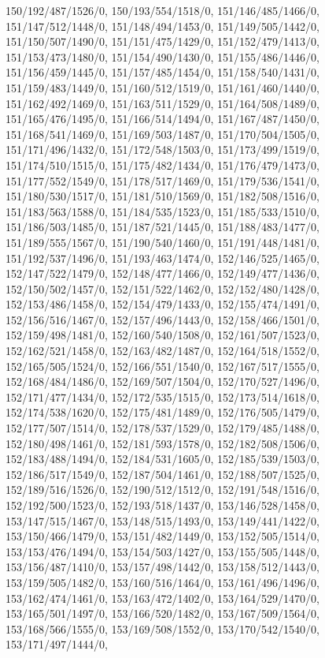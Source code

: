 {150/192/487/1526/0,%
150/193/554/1518/0,%
151/146/485/1466/0,%
151/147/512/1448/0,%
151/148/494/1453/0,%
151/149/505/1442/0,%
151/150/507/1490/0,%
151/151/475/1429/0,%
151/152/479/1413/0,%
151/153/473/1480/0,%
151/154/490/1430/0,%
151/155/486/1446/0,%
151/156/459/1445/0,%
151/157/485/1454/0,%
151/158/540/1431/0,%
151/159/483/1449/0,%
151/160/512/1519/0,%
151/161/460/1440/0,%
151/162/492/1469/0,%
151/163/511/1529/0,%
151/164/508/1489/0,%
151/165/476/1495/0,%
151/166/514/1494/0,%
151/167/487/1450/0,%
151/168/541/1469/0,%
151/169/503/1487/0,%
151/170/504/1505/0,%
151/171/496/1432/0,%
151/172/548/1503/0,%
151/173/499/1519/0,%
151/174/510/1515/0,%
151/175/482/1434/0,%
151/176/479/1473/0,%
151/177/552/1549/0,%
151/178/517/1469/0,%
151/179/536/1541/0,%
151/180/530/1517/0,%
151/181/510/1569/0,%
151/182/508/1516/0,%
151/183/563/1588/0,%
151/184/535/1523/0,%
151/185/533/1510/0,%
151/186/503/1485/0,%
151/187/521/1445/0,%
151/188/483/1477/0,%
151/189/555/1567/0,%
151/190/540/1460/0,%
151/191/448/1481/0,%
151/192/537/1496/0,%
151/193/463/1474/0,%
152/146/525/1465/0,%
152/147/522/1479/0,%
152/148/477/1466/0,%
152/149/477/1436/0,%
152/150/502/1457/0,%
152/151/522/1462/0,%
152/152/480/1428/0,%
152/153/486/1458/0,%
152/154/479/1433/0,%
152/155/474/1491/0,%
152/156/516/1467/0,%
152/157/496/1443/0,%
152/158/466/1501/0,%
152/159/498/1481/0,%
152/160/540/1508/0,%
152/161/507/1523/0,%
152/162/521/1458/0,%
152/163/482/1487/0,%
152/164/518/1552/0,%
152/165/505/1524/0,%
152/166/551/1540/0,%
152/167/517/1555/0,%
152/168/484/1486/0,%
152/169/507/1504/0,%
152/170/527/1496/0,%
152/171/477/1434/0,%
152/172/535/1515/0,%
152/173/514/1618/0,%
152/174/538/1620/0,%
152/175/481/1489/0,%
152/176/505/1479/0,%
152/177/507/1514/0,%
152/178/537/1529/0,%
152/179/485/1488/0,%
152/180/498/1461/0,%
152/181/593/1578/0,%
152/182/508/1506/0,%
152/183/488/1494/0,%
152/184/531/1605/0,%
152/185/539/1503/0,%
152/186/517/1549/0,%
152/187/504/1461/0,%
152/188/507/1525/0,%
152/189/516/1526/0,%
152/190/512/1512/0,%
152/191/548/1516/0,%
152/192/500/1523/0,%
152/193/518/1437/0,%
153/146/528/1458/0,%
153/147/515/1467/0,%
153/148/515/1493/0,%
153/149/441/1422/0,%
153/150/466/1479/0,%
153/151/482/1449/0,%
153/152/505/1514/0,%
153/153/476/1494/0,%
153/154/503/1427/0,%
153/155/505/1448/0,%
153/156/487/1410/0,%
153/157/498/1442/0,%
153/158/512/1443/0,%
153/159/505/1482/0,%
153/160/516/1464/0,%
153/161/496/1496/0,%
153/162/474/1461/0,%
153/163/472/1402/0,%
153/164/529/1470/0,%
153/165/501/1497/0,%
153/166/520/1482/0,%
153/167/509/1564/0,%
153/168/566/1555/0,%
153/169/508/1552/0,%
153/170/542/1540/0,%
153/171/497/1444/0,%
}
